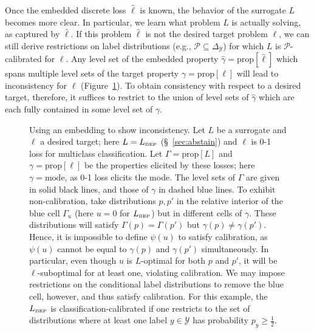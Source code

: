 \documentclass[11pt]{article}
\newcommand{\prop}[1]{\mathrm{prop}[#1]}
\newcommand{\BEP}{L_{\text{\tiny BEP}}}
\newcommand{\mode}{\mathrm{mode}}
\newcommand{\simplex}{\Delta_\Y}
\renewcommand{\P}{\mathcal{P}}
\newcommand{\Y}{\mathcal{Y}}
\begin{document}
Once the embedded discrete loss $\hat\ell$ is known, the behavior of the surrogate $L$ becomes more clear.
In particular, we learn what problem $L$ is actually solving, as captured by $\hat\ell$.
If this problem $\hat\ell$ is not the desired target problem $\ell$, we can still derive restrictions on label distributions (e.g., $\P \subseteq \simplex$) for which $L$ is $\P$-calibrated for $\ell$.
Any level set of the embedded property $\hat\gamma = \prop{\hat\ell}$ which spans multiple level sets of the target property $\gamma=\prop{\ell}$ will lead to inconsistency for $\ell$ (Figure~\ref{fig:abstain-intuition-inconsistent}).
To obtain consistency with respect to a desired target, therefore, it suffices to restrict to the union of level sets of $\hat\gamma$ which are each fully contained in some level set of $\gamma$.

\begin{figure}
	\begin{minipage}{0.29\linewidth}
    
\end{minipage}
\begin{minipage}{0.71\linewidth}
	\caption{Using an embedding to show inconsistency.
    Let $L$ be a surrogate and $\ell$ a desired target; here $L=\BEP$ (\S~\ref{sec:abstain}) and $\ell$ is 0-1 loss for multiclass classification.
    Let $\Gamma = \prop{L}$ and $\gamma = \prop{\ell}$ be the properties elicited by these losses; here $\gamma = \mode$, as 0-1 loss elicits the mode.
    The level sets of $\Gamma$ are given in solid black lines, and those of $\gamma$ in dashed blue lines.
    To exhibit non-calibration, take distributions $p, p'$ in the relative interior of the blue cell $\Gamma_u$ (here $u=0$ for $\BEP$) but in different cells of $\gamma$.
    These distributions will satisfy $\Gamma(p) = \Gamma(p')$ but $\gamma(p) \neq \gamma(p')$.
    Hence, it is impossible to define $\psi(u)$ to satisfy calibration, as $\psi(u)$ cannot be equal to $\gamma(p)$ and $\gamma(p')$ simultaneously.
    In particular, even though $u$ is $L$-optimal for both $p$ and $p'$, it will be $\ell$-suboptimal for at least one, violating calibration.
    We may impose restrictions on the conditional label distributions to remove the blue cell, however, and thus satisfy calibration.
    For this example, the $\BEP$ is classification-calibrated if one restricts to the set of distributions where at least one label $y\in\Y$ has probability $p_y \geq \tfrac 1 2$.
	}
	\label{fig:abstain-intuition-inconsistent}
	\end{minipage}
\end{figure}
\end{document}
